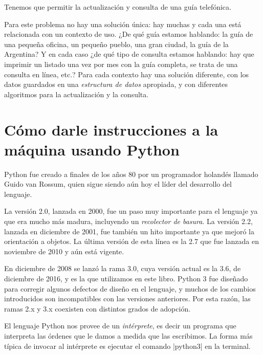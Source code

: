 \begin{problemac}

Tenemos que permitir la actualización y consulta de una guía
telefónica.

\end{problemac}

Para este problema no hay una solución única: hay muchas y cada
una está relacionada con un contexto de uso. ¿De qué guía estamos
hablando: la guía de una pequeña oficina, un pequeño pueblo, una
gran ciudad, la guía de la Argentina? Y en cada caso ¿de qué tipo
de consulta estamos hablando: hay que imprimir un listado una vez
por mes con la guía completa, se trata de una consulta en línea,
etc.? Para cada contexto hay una solución diferente, con los datos
guardados en una \emph{estructura de datos} apropiada, y con
diferentes algoritmos para la actualización y la consulta.

%
%

\section{Cómo darle instrucciones a la máquina usando Python}

\begin{sabias_que}
Python fue creado a finales de los años 80 por un programador holandés
llamado Guido van Rossum, quien sigue siendo aún hoy el líder del
desarrollo del lenguaje.

La versión 2.0, lanzada en 2000, fue un paso muy importante para el
lenguaje ya que era mucho más madura, incluyendo un \textit{recolector de
basura}.  La versión 2.2, lanzada en diciembre de 2001, fue también un hito
importante ya que mejoró la orientación a objetos.  La última versión de
esta línea es la 2.7 que fue lanzada en noviembre de 2010 y aún está vigente.

En diciembre de 2008 se lanzó la rama 3.0, cuya versión actual es la 3.6, de
diciembre de 2016, y es la que utilizamos en este libro. Python 3 fue diseñado
para corregir algunos defectos de diseño en el lenguaje, y muchos de los
cambios introducidos son incompatibles con las versiones anteriores. Por esta
razón, las ramas 2.x y 3.x coexisten con distintos grados de adopción.
\end{sabias_que}

El lenguaje Python nos provee de un \emph{intérprete}, es decir un programa que
interpreta las órdenes que le damos a medida que las escribimos. La forma más
típica de invocar al intérprete es ejecutar el comando |python3| en
la terminal.

